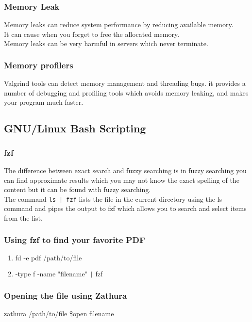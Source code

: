 \documentclass{article}
\begin{document}
\subsubsection{Memory Leak}
Memory leaks can reduce system performance by reducing available memory.\\
It can cause when you forget to free the allocated memory.\\
Memory leaks can be very harmful in servers which never terminate.
\subsubsection{Memory profilers}
Valgrind tools can detect memory management and threading bugs. it provides a number of debugging and profiling tools which avoids memory leaking, and makes your program much faster.
\subsection{GNU/Linux Bash Scripting}
\subsubsection{fzf}
The difference between exact search and fuzzy searching is in fuzzy searching you can find approximate results which you may not know the exact spelling of the content but it can be found with fuzzy searching.\\
The command \texttt{ls | fzf} lists the file in the current directory using the ls command and pipes the output to fzf which allows you to search and select items from the list.
\subsubsection{Using fzf to find your favorite PDF}
\begin{enumerate}
    \item fd -e pdf /path/to/file
    \item -type f -name "filename" \texttt{|} fzf
\end{enumerate}
\subsubsection{Opening the file using Zathura}
zathura /path/to/file \$open filename
\end{document}
